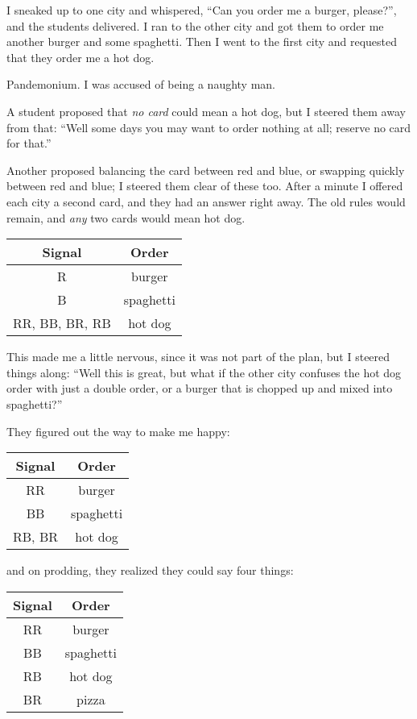 \documentclass[sigplan,review]{acmart}
\begin{document}
I sneaked up to one city and whispered, ``Can you order me a burger, please?'', and the students delivered.
I ran to the other city and got them to order me another burger and some spaghetti.
Then I went to the first city and requested that they order me a hot dog.

Pandemonium.
I was accused of being a naughty man.

A student proposed that \emph{no card} could mean a hot dog, but I steered them away from that: ``Well some days you may want to order nothing at all; reserve no card for that.''

Another proposed balancing the card between red and blue, or swapping quickly between red and blue; I steered them clear of these too.
After a minute I offered each city a second card, and they had an answer right away.
The old rules would remain, and \emph{any} two cards would mean hot dog.

\begin{table}[h]\sffamily
  \begin{tabular}{cc}
  Signal & Order \\
  \midrule
  R & burger \\
  B & spaghetti \\
  RR, BB, BR, RB & hot dog
  \end{tabular}
\end{table}

This made me a little nervous, since it was not part of the plan, but I steered things along:
``Well this is great, but what if the other city confuses the hot dog order with just a double order, or a burger that is chopped up and mixed into spaghetti?''

They figured out the way to make me happy:

\begin{table}[h]\sffamily
  \begin{tabular}{cc}
  Signal & Order \\
  \midrule
  RR & burger \\
  BB & spaghetti \\
  RB, BR & hot dog
  \end{tabular}
\end{table}

\noindent and on prodding, they realized they could say four things:

\begin{table}[h]\sffamily
  \begin{tabular}{cc}
  Signal & Order \\
  \midrule
  RR & burger \\
  BB & spaghetti \\
  RB & hot dog \\
  BR & pizza
  \end{tabular}
\end{table}
\end{document}

